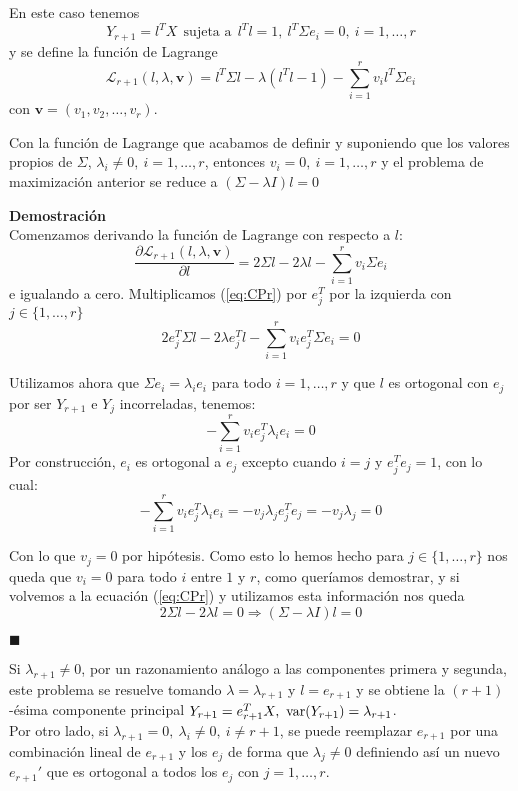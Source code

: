 En este caso tenemos 
\[	Y_{r+1} = l^TX\ \ \text{sujeta a}\ \ l^Tl = 1,\  l^T\Sigma e_i = 0, \ i = 1, \dots, r	\]
y se define la función de Lagrange
\[	\mathcal{L}_{r+1}(l, \lambda, \mathbf{v}) = l^T \Sigma l - \lambda (l^T l - 1) - \sum_{i=1}^r v_i l^T \Sigma e_i	\]
con $\mathbf{v} = (v_1, v_2, \dots, v_r)$.\\

\begin{proposicion}
Con la función de Lagrange que acabamos de definir y suponiendo que los valores propios de $\Sigma$, $\lambda_i \neq 0,\  i=1, \dots, r$, entonces $v_i = 0, \  i=1, \dots, r$ y el problema de maximización anterior se reduce a $(\Sigma - \lambda I)l = 0$
\end{proposicion}
\textbf{Demostración}\\

Comenzamos derivando la función de Lagrange con respecto a $l$:
\begin{equation}\label{eq:CPr}
	\frac{\partial \mathcal{L}_{r+1}(l, \lambda, \mathbf{v})}{\partial l} = 2 \Sigma l - 2 \lambda l - \sum_{i=1}^r v_i \Sigma e_i
\end{equation}
e igualando a cero. Multiplicamos (\ref{eq:CPr}) por $e_j^T$ por la izquierda con $j \in \{1, \dots, r\}$
\[	2 e_j^T \Sigma l - 2 \lambda e_j^T l - \sum_{i=1}^r v_i e_j^T \Sigma e_i = 0	\]

Utilizamos ahora que $\Sigma e_i = \lambda_i e_i$ para todo $i = 1, \dots, r$ y que $l$ es ortogonal con $e_j$ por ser $Y_{r+1}$ e $Y_j$ incorreladas, tenemos:
\[ - \sum_{i=1}^r v_i e_j^T \lambda_i e_i = 0	\]
Por construcción, $e_i$ es ortogonal a $e_j$ excepto cuando $i=j$ y $e_j^T e_j = 1$, con lo cual:
\[	- \sum_{i=1}^r v_i e_j^T \lambda_i e_i = - v_j \lambda_j e_j^T e_j = - v_j \lambda_j = 0	\]

Con lo que $v_j = 0$ por hipótesis. Como esto lo hemos hecho para $j \in \{1, \dots, r \}$ nos queda que $v_i = 0$ para todo $i$ entre $1$ y $r$, como queríamos demostrar, y si volvemos a la ecuación (\ref{eq:CPr}) y utilizamos esta información nos queda
\[	2 \Sigma l - 2 \lambda l = 0 \Rightarrow (\Sigma - \lambda I) l = 0 \]

\begin{flushright}
$\blacksquare$
\end{flushright}

Si $\lambda_{r+1} \neq 0$, por un razonamiento análogo a las componentes primera y segunda, este problema se resuelve tomando $\lambda = \lambda_{r+1}$ y $l = e_{r+1}$ y se obtiene la $(r+1)$-ésima componente principal $Y_{r+1} = e^T_{r+1}X,\ \var{(Y_{r+1})} = \lambda_{r+1}$.\\
Por otro lado, si $\lambda_{r+1} = 0,\ \lambda_i \neq 0,\ i \neq r+1$, se puede reemplazar $e_{r+1}$ por una combinación lineal de $e_{r+1}$ y los $e_j$ de forma que $\lambda_j \neq 0$ definiendo así un nuevo $e_{r+1}'$ que es ortogonal a todos los $e_j$ con $j = 1, \dots, r$.\\


